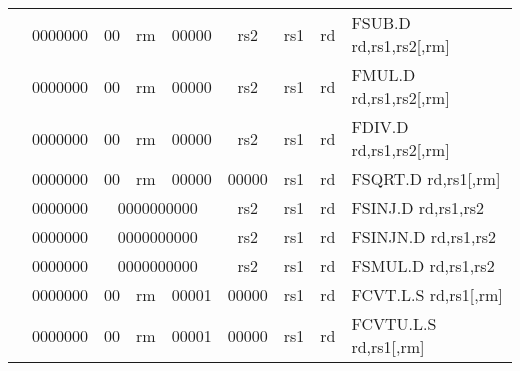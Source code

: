 \begin{table}[p]
\begin{small}
\begin{center}
\begin{tabular}{rcccccccccl}
&
\multicolumn{1}{|c|}{0000000} &
\multicolumn{1}{c|}{00} &
\multicolumn{2}{c|}{rm} &
\multicolumn{2}{c|}{00000} &
\multicolumn{1}{c|}{rs2} &
\multicolumn{1}{c|}{rs1} &
\multicolumn{1}{c|}{rd} & FSUB.D rd,rs1,rs2[,rm] \\
\cline{2-10}
  

&
\multicolumn{1}{|c|}{0000000} &
\multicolumn{1}{c|}{00} &
\multicolumn{2}{c|}{rm} &
\multicolumn{2}{c|}{00000} &
\multicolumn{1}{c|}{rs2} &
\multicolumn{1}{c|}{rs1} &
\multicolumn{1}{c|}{rd} & FMUL.D rd,rs1,rs2[,rm] \\
\cline{2-10}
  

&
\multicolumn{1}{|c|}{0000000} &
\multicolumn{1}{c|}{00} &
\multicolumn{2}{c|}{rm} &
\multicolumn{2}{c|}{00000} &
\multicolumn{1}{c|}{rs2} &
\multicolumn{1}{c|}{rs1} &
\multicolumn{1}{c|}{rd} & FDIV.D rd,rs1,rs2[,rm] \\
\cline{2-10}
  

&
\multicolumn{1}{|c|}{0000000} &
\multicolumn{1}{c|}{00} &
\multicolumn{2}{c|}{rm} &
\multicolumn{2}{c|}{00000} &
\multicolumn{1}{c|}{00000} &
\multicolumn{1}{c|}{rs1} &
\multicolumn{1}{c|}{rd} & FSQRT.D rd,rs1[,rm] \\
\cline{2-10}
  

&
\multicolumn{1}{|c|}{0000000} &
\multicolumn{5}{c|}{0000000000} &
\multicolumn{1}{c|}{rs2} &
\multicolumn{1}{c|}{rs1} &
\multicolumn{1}{c|}{rd} & FSINJ.D rd,rs1,rs2 \\
\cline{2-10}
  

&
\multicolumn{1}{|c|}{0000000} &
\multicolumn{5}{c|}{0000000000} &
\multicolumn{1}{c|}{rs2} &
\multicolumn{1}{c|}{rs1} &
\multicolumn{1}{c|}{rd} & FSINJN.D rd,rs1,rs2 \\
\cline{2-10}
  

&
\multicolumn{1}{|c|}{0000000} &
\multicolumn{5}{c|}{0000000000} &
\multicolumn{1}{c|}{rs2} &
\multicolumn{1}{c|}{rs1} &
\multicolumn{1}{c|}{rd} & FSMUL.D rd,rs1,rs2 \\
\cline{2-10}
  

&
\multicolumn{1}{|c|}{0000000} &
\multicolumn{1}{c|}{00} &
\multicolumn{2}{c|}{rm} &
\multicolumn{2}{c|}{00001} &
\multicolumn{1}{c|}{00000} &
\multicolumn{1}{c|}{rs1} &
\multicolumn{1}{c|}{rd} & FCVT.L.S rd,rs1[,rm] \\
\cline{2-10}
  

&
\multicolumn{1}{|c|}{0000000} &
\multicolumn{1}{c|}{00} &
\multicolumn{2}{c|}{rm} &
\multicolumn{2}{c|}{00001} &
\multicolumn{1}{c|}{00000} &
\multicolumn{1}{c|}{rs1} &
\multicolumn{1}{c|}{rd} & FCVTU.L.S rd,rs1[,rm] \\
\cline{2-10}
  


\end{tabular}
\end{center}
\end{small}
\end{table}
